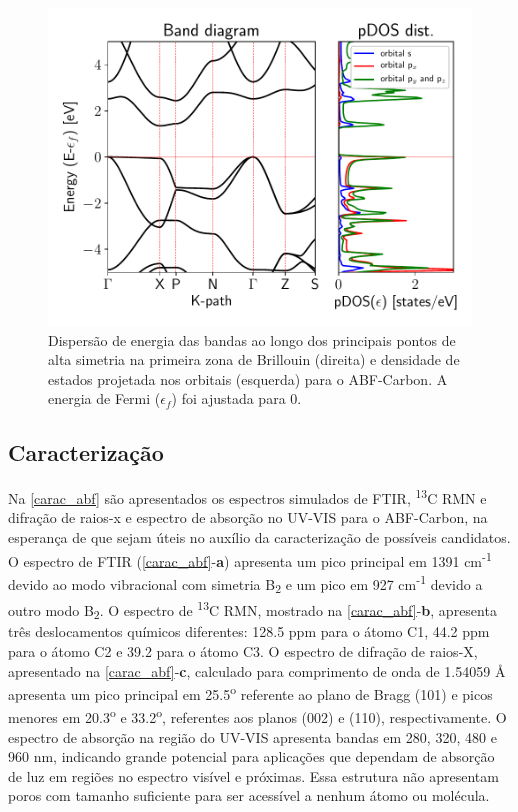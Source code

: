 		
		\begin{figure}[!ht]
			\centering
			\includegraphics[width=.7\linewidth]{capitulos/fig/results2/band_structure}
			\caption{Dispersão de energia das bandas ao longo dos principais pontos de alta simetria na primeira zona de Brillouin (direita) e densidade de estados projetada nos orbitais (esquerda) para o ABF-Carbon. A energia de Fermi ($\epsilon_f$) foi ajustada para 0.}
			\label{band_ABF}
		\end{figure}
		
	\subsection{Caracterização}
		
		Na \autoref{carac_abf} são apresentados os espectros simulados de FTIR, \textsuperscript{13}C RMN e difração de raios-x e espectro de absorção no UV-VIS para o ABF-Carbon, na esperança de que sejam úteis no auxílio da caracterização de possíveis candidatos. O espectro de FTIR (\autoref{carac_abf}-\textbf{a}) apresenta um pico principal em 1391 cm\textsuperscript{-1} devido ao modo vibracional com simetria B\textsubscript{2} e um pico  em 927 cm\textsuperscript{-1} devido a outro modo B\textsubscript{2}. O espectro de \textsuperscript{13}C RMN, mostrado na \autoref{carac_abf}-\textbf{b}, apresenta três deslocamentos químicos diferentes: 128.5 ppm para o átomo C1, 44.2 ppm para o átomo C2 e 39.2 para o átomo C3. O espectro de difração de raios-X, apresentado na \autoref{carac_abf}-\textbf{c}, calculado para comprimento de onda de 1.54059 \AA{} apresenta um pico principal em 25.5\textsuperscript{o} referente ao plano de Bragg (101) e picos menores em 20.3\textsuperscript{o} e 33.2\textsuperscript{o}, referentes aos planos (002) e (110), respectivamente. O espectro de absorção na região do UV-VIS apresenta bandas em 280, 320, 480 e 960 nm, indicando grande potencial para aplicações que dependam de absorção de luz em regiões no espectro visível e próximas. Essa estrutura não apresentam poros com tamanho suficiente para ser acessível a nenhum átomo ou molécula. 
	
